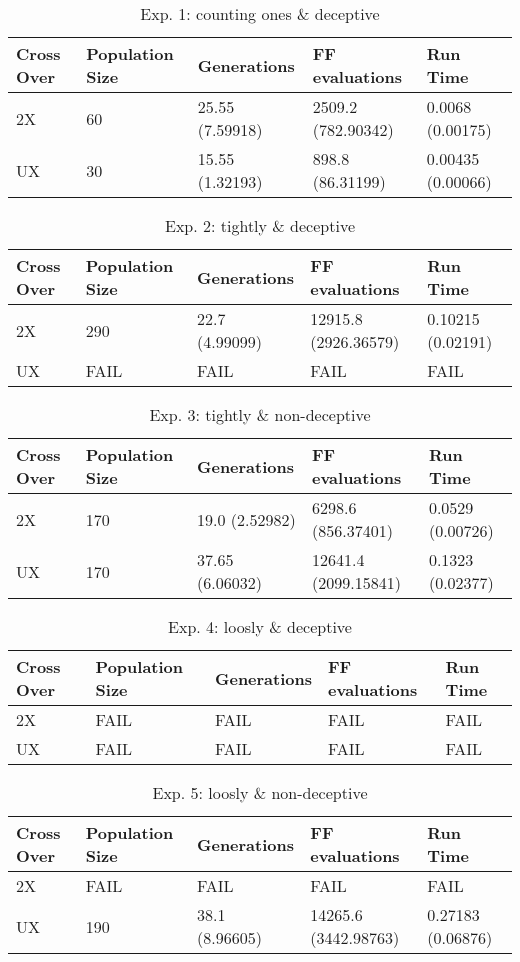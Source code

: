 \documentclass{article}%
\begin{document}
%
\normalsize%


\begin{table}[htb]%
\caption{Exp. 1: counting ones \& deceptive}%
\begin{tabular}{l l l l l}%
Cross Over&Population Size&Generations&FF evaluations&Run Time\\%
\hline%
2X&60&25.55 (7.59918)&2509.2 (782.90342)&0.0068 (0.00175)\\%
UX&30&15.55 (1.32193)&898.8 (86.31199)&0.00435 (0.00066)\\%
\end{tabular}%
\end{table}
\begin{table}[htb]%
\caption{Exp. 2: tightly \& deceptive}%
\begin{tabular}{l l l l l}%
Cross Over&Population Size&Generations&FF evaluations&Run Time\\%
\hline%
2X&290&22.7 (4.99099)&12915.8 (2926.36579)&0.10215 (0.02191)\\%
UX&FAIL&FAIL&FAIL&FAIL\\%
\end{tabular}%
\end{table}
\begin{table}[htb]%
\caption{Exp. 3: tightly \& non{-}deceptive}%
\begin{tabular}{l l l l l}%
Cross Over&Population Size&Generations&FF evaluations&Run Time\\%
\hline%
2X&170&19.0 (2.52982)&6298.6 (856.37401)&0.0529 (0.00726)\\%
UX&170&37.65 (6.06032)&12641.4 (2099.15841)&0.1323 (0.02377)\\%
\end{tabular}%
\end{table}
\begin{table}[htb]%
\caption{Exp. 4: loosly \& deceptive}%
\begin{tabular}{l l l l l}%
Cross Over&Population Size&Generations&FF evaluations&Run Time\\%
\hline%
2X&FAIL&FAIL&FAIL&FAIL\\%
UX&FAIL&FAIL&FAIL&FAIL\\%
\end{tabular}%
\end{table}
\begin{table}[htb]%
\caption{Exp. 5: loosly \& non{-}deceptive}%
\begin{tabular}{l l l l l}%
Cross Over&Population Size&Generations&FF evaluations&Run Time\\%
\hline%
2X&FAIL&FAIL&FAIL&FAIL\\%
UX&190&38.1 (8.96605)&14265.6 (3442.98763)&0.27183 (0.06876)\\%
\end{tabular}%
\end{table}
\end{document}
